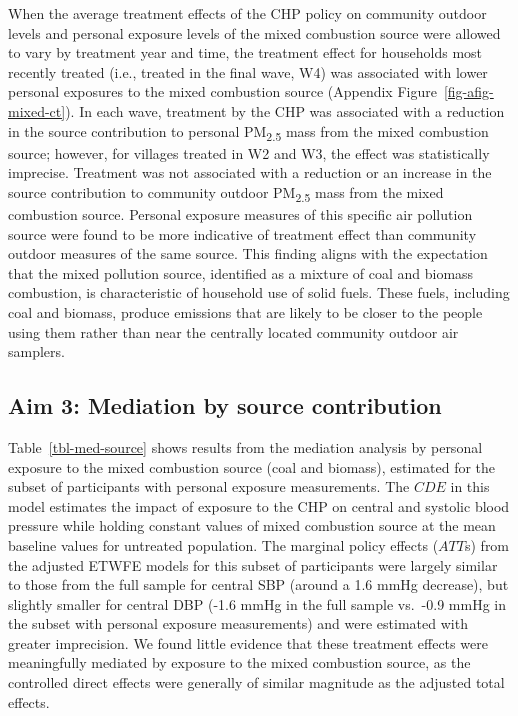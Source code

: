 \documentclass[
  letterpaper,
  DIV=11,
  numbers=noendperiod]{scrartcl}
\begin{document}
When the average treatment effects of the CHP policy on community
outdoor levels and personal exposure levels of the mixed combustion
source were allowed to vary by treatment year and time, the treatment
effect for households most recently treated (i.e., treated in the final
wave, W4) was associated with lower personal exposures to the mixed
combustion source (Appendix Figure~\ref{fig-afig-mixed-ct}). In each
wave, treatment by the CHP was associated with a reduction in the source
contribution to personal PM\textsubscript{2.5} mass from the mixed
combustion source; however, for villages treated in W2 and W3, the
effect was statistically imprecise. Treatment was not associated with a
reduction or an increase in the source contribution to community outdoor
PM\textsubscript{2.5} mass from the mixed combustion source. Personal
exposure measures of this specific air pollution source were found to be
more indicative of treatment effect than community outdoor measures of
the same source. This finding aligns with the expectation that the mixed
pollution source, identified as a mixture of coal and biomass
combustion, is characteristic of household use of solid fuels. These
fuels, including coal and biomass, produce emissions that are likely to
be closer to the people using them rather than near the centrally
located community outdoor air samplers.

\subsection{Aim 3: Mediation by source
contribution}\label{aim-3-mediation-by-source-contribution}

Table~\ref{tbl-med-source} shows results from the mediation analysis by
personal exposure to the mixed combustion source (coal and biomass),
estimated for the subset of participants with personal exposure
measurements. The \(CDE\) in this model estimates the impact of exposure
to the CHP on central and systolic blood pressure while holding constant
values of mixed combustion source at the mean baseline values for
untreated population. The marginal policy effects (\(ATT\)s) from the
adjusted ETWFE models for this subset of participants were largely
similar to those from the full sample for central SBP (around a 1.6 mmHg
decrease), but slightly smaller for central DBP (-1.6 mmHg in the full
sample vs.~-0.9 mmHg in the subset with personal exposure measurements)
and were estimated with greater imprecision. We found little evidence
that these treatment effects were meaningfully mediated by exposure to
the mixed combustion source, as the controlled direct effects were
generally of similar magnitude as the adjusted total effects.
\end{document}

